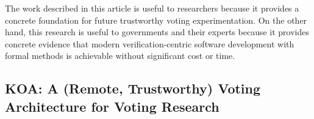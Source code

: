 \documentclass[letterpaper,twocolumn,10pt]{article}
\begin{document}
The work described in this article is useful to researchers because it
provides a concrete foundation for future trustworthy voting
experimentation.  On the other hand, this research is useful to
governments and their experts because it provides concrete evidence
that modern verification-centric software development with formal
methods is achievable without significant cost or time.  
%
% 
% 
% 
\subsection{KOA: A (Remote, Trustworthy) Voting Architecture for Voting Research}
\end{document}
